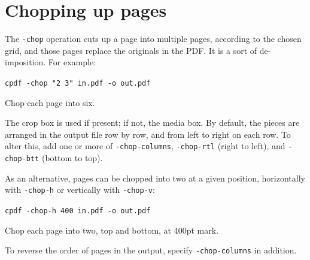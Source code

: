 \documentclass{book}
\begin{document}
\section{Chopping up pages}


The \texttt{-chop} operation cuts up a page into multiple pages, according to the chosen grid, and those pages replace the originals in the PDF. It is a sort of de-imposition. For example:

  \begin{framed}
    \noindent\small\verb!cpdf -chop "2 3" in.pdf -o out.pdf!
 
    \vspace{2.5mm}
    \noindent Chop each page into six.
  \end{framed}

\noindent The crop box is used if present; if not, the media box. By default, the pieces are arranged in the output file row by row, and from left to right on each row. To alter this, add one or more of \texttt{-chop-columns}, \texttt{-chop-rtl} (right to left), and \texttt{-chop-btt} (bottom to top).

As an alternative, pages can be chopped into two at a given position, horizontally with \texttt{-chop-h} or vertically with \texttt{-chop-v}:

  \begin{framed}
    \noindent\small\verb!cpdf -chop-h 400 in.pdf -o out.pdf!
 
    \vspace{2.5mm}
    \noindent Chop each page into two, top and bottom, at 400pt mark.
  \end{framed}

\noindent To reverse the order of pages in the output, specify \texttt{-chop-columns} in addition.
\end{document}
